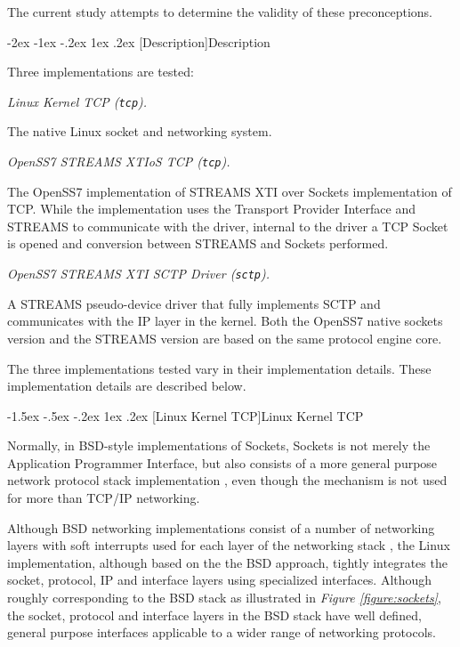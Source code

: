 \documentclass[letterpaper,final,notitlepage,twocolumn,10pt,twoside]{article}
\makeatletter
\renewcommand\section{\@startsection {section}{1}{\z@}%
                                   {-2ex \@plus -1ex \@minus -.2ex}%
                                   {1ex \@plus .2ex}%
                                   {\normalfont\large\bfseries}}
\renewcommand\subsection{\@startsection{subsection}{2}{\z@}%
                                     {-1.5ex \@plus -.5ex \@minus -.2ex}%
                                     {1ex \@plus .2ex}%
                                     {\normalfont\normalsize\bfseries}}
\makeatother
\begin{document}
The current study attempts to determine the validity of these preconceptions.

\section[Description]{Description}

Three implementations are tested:

\begin{description}

\item {\it Linux Kernel TCP ({\tt tcp}).}

The native Linux socket and networking system.

\item {\it OpenSS7 STREAMS XTIoS TCP ({\tt tcp}).}

The OpenSS7 implementation of STREAMS XTI over Sockets implementation of TCP.  While the
implementation uses the Transport Provider Interface and STREAMS to communicate with the driver,
internal to the driver a TCP Socket is opened and conversion between STREAMS and Sockets performed.

\item {\it OpenSS7 STREAMS XTI SCTP Driver ({\tt sctp}).}

A STREAMS pseudo-device driver that fully implements SCTP and communicates with the IP layer in the
kernel.  Both the OpenSS7 native sockets version and the STREAMS version are based on the same
protocol engine core.

\end{description}

The three implementations tested vary in their implementation details.  These implementation details
are described below.

\subsection[Linux Kernel TCP]{Linux Kernel TCP}
\label{section:lktcp}

Normally, in BSD-style implementations of Sockets, Sockets is not merely the Application Programmer
Interface, but also consists of a more general purpose network protocol stack implementation
\cite[]{bsd}, even though the mechanism is not used for more than TCP/IP networking.  \cite[]{magic}

Although BSD networking implementations consist of a number of networking layers with soft
interrupts used for each layer of the networking stack \cite[]{bsd}, the Linux implementation,
although based on the the BSD approach, tightly integrates the socket, protocol, IP and interface
layers using specialized interfaces.  Although roughly corresponding to the BSD stack as illustrated
in \textit{Figure \ref{figure:sockets}}, the socket, protocol and interface layers in the BSD stack
have well defined, general purpose interfaces applicable to a wider range of networking protocols.
\end{document}
